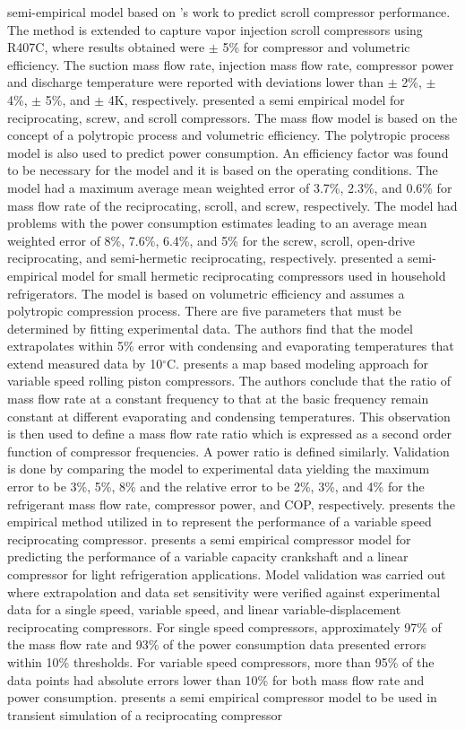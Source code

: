 \documentclass[preprint,11pt,authoryear]{elsarticle}
\begin{document}
semi-empirical model based on \cite{Navarro2007}'s work to predict scroll compressor performance. The method is extended to capture vapor injection scroll compressors using R407C, where results obtained were $\pm$ 5\% for compressor and volumetric efficiency. The suction mass flow rate, injection mass flow rate, compressor power and discharge temperature were reported with deviations lower than $\pm$ 2\%, $\pm$ 4\%, $\pm$ 5\%, and $\pm$ 4K, respectively. \cite{Mackensen2002} presented a semi empirical model for reciprocating, screw, and scroll compressors. The mass flow model is based on the concept of a polytropic process and volumetric efficiency. The polytropic process model is also used to predict power consumption. An efficiency factor was found to be necessary for the model and it is based on the operating conditions. The model had a maximum average mean weighted error of 3.7\%, 2.3\%, and 0.6\% for mass flow rate of the reciprocating, scroll, and screw, respectively. The model had problems with the power consumption estimates leading to an average mean weighted error of 8\%, 7.6\%, 6.4\%, and 5\% for the screw, scroll, open-drive reciprocating, and semi-hermetic reciprocating, respectively. \cite{Jahnig2000} presented a semi-empirical model for small hermetic reciprocating compressors used in household refrigerators. The model is based on volumetric efficiency and assumes a polytropic compression process. There are five parameters that must be determined by fitting experimental data. The authors find that the model extrapolates within 5\% error with condensing and evaporating temperatures that extend measured data by 10$^{\circ}$C. \cite{Shao2004a} presents a map based modeling approach for variable speed rolling piston compressors. The authors conclude that the ratio of mass flow rate at a constant frequency to that at the basic frequency remain constant at different evaporating and condensing temperatures. This observation is then used to define a mass flow rate ratio which is expressed as a second order function of compressor frequencies. A power ratio is defined similarly. Validation is done by comparing the model to experimental data yielding the maximum error to be 3\%, 5\%, 8\% and the relative error to be 2\%, 3\%, and 4\% for the refrigerant mass flow rate, compressor power, and COP, respectively. \cite{Aprea2008} presents the empirical method utilized in \cite{Shao2004a} to represent the performance of a variable speed reciprocating compressor. \cite{Santos2019} presents a semi empirical compressor model for predicting the performance of a variable capacity crankshaft and a linear compressor for light refrigeration applications. Model validation was carried out where extrapolation and data set sensitivity were verified against experimental data for a single speed, variable speed, and linear variable-displacement reciprocating compressors. For single speed compressors, approximately 97\% of the mass flow rate and 93\% of the power consumption data presented errors within 10\% thresholds. For variable speed compressors, more than 95\% of the data points had absolute errors lower than 10\% for both mass flow rate and power consumption. \cite{Negrao2011} presents a semi empirical compressor model to be used in transient simulation of a reciprocating compressor 
\end{document}
